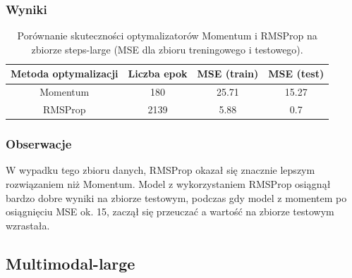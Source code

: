\documentclass{article}
\begin{document}
\subsubsection*{Wyniki}
\begin{table}[H]
    \centering
    \begin{tabular}{|c|c|c|c|}
        \hline
        Metoda optymalizacji & Liczba epok & MSE (train) & MSE (test) \\
        \hline
        Momentum & 180 & 25.71 & 15.27 \\
        RMSProp & 2139 & 5.88 & 0.7 \\
        \hline
    \end{tabular}
    \caption{Porównanie skuteczności optymalizatorów Momentum i RMSProp na zbiorze steps-large (MSE dla zbioru treningowego i testowego).}
\end{table}

\subsubsection*{Obserwacje}
W wypadku tego zbioru danych, RMSProp okazał się znacznie lepszym rozwiązaniem niż Momentum. Model z wykorzystaniem RMSProp osiągnął bardzo dobre wyniki na zbiorze testowym, podczas gdy model z momentem po osiągnięciu MSE ok. 15, zaczął się przeuczać a wartość na zbiorze testowym wzrastała.

\subsection*{Multimodal-large}
\end{document}
